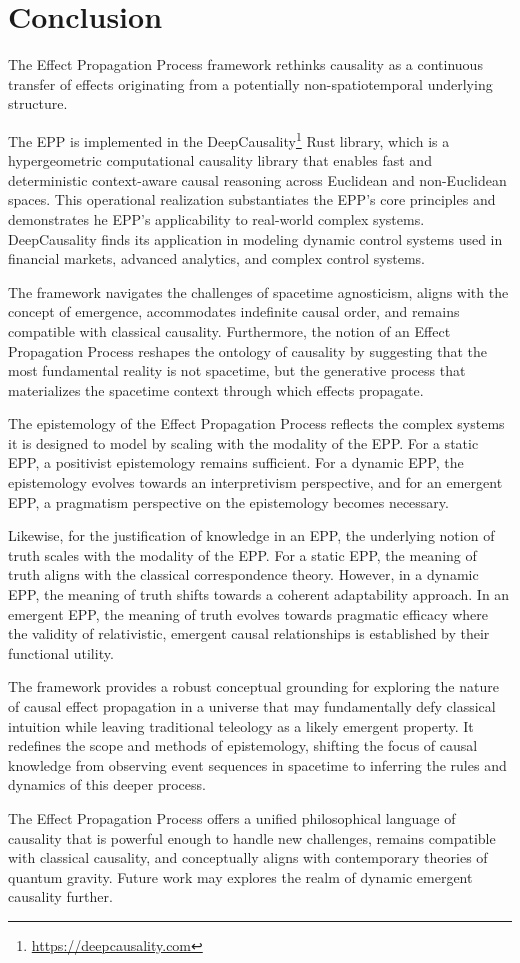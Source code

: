 \section{Conclusion}
\label{sec:conclusion}

The Effect Propagation Process framework rethinks causality as a continuous transfer of effects originating from a potentially non-spatiotemporal underlying structure. 

The EPP is implemented in the DeepCausality\footnote{\url{https://deepcausality.com}} Rust library, which is a hypergeometric computational causality library that enables fast and deterministic context-aware causal reasoning across Euclidean and non-Euclidean spaces. This operational realization substantiates the EPP’s core principles and demonstrates he EPP’s applicability to real-world complex systems.  DeepCausality finds its application in modeling dynamic control systems used in financial markets, advanced analytics, and complex control systems.

The framework navigates the challenges of spacetime agnosticism, aligns with the concept of emergence, accommodates indefinite causal order, and remains compatible with classical causality. Furthermore, the notion of an Effect Propagation Process reshapes the ontology of causality by suggesting that the most fundamental reality is not spacetime, but the generative process that materializes the spacetime context through which effects propagate.

The epistemology of the Effect Propagation Process reflects the complex systems it is designed to model by scaling with the modality of the EPP. For a static EPP, a positivist epistemology remains sufficient. For a dynamic EPP, the epistemology evolves towards an interpretivism perspective, and for an emergent EPP, a pragmatism perspective on the epistemology becomes necessary.

Likewise, for the justification of knowledge in an EPP, the underlying notion of truth scales with the modality of the EPP. For a static EPP, the meaning of truth aligns with the classical correspondence theory. However, in a dynamic EPP, the meaning of truth shifts towards a coherent adaptability approach. In an emergent EPP, the meaning of truth evolves towards pragmatic efficacy where the validity of relativistic, emergent causal relationships is established by their functional utility.

The framework provides a robust conceptual grounding for exploring the nature of causal effect propagation in a universe that may fundamentally defy classical intuition while leaving traditional teleology as a likely emergent property. It redefines the scope and methods of epistemology, shifting the focus of causal knowledge from observing event sequences in spacetime to inferring the rules and dynamics of this deeper process.

The Effect Propagation Process offers a unified philosophical language of causality that is powerful enough to handle new challenges, remains compatible with classical causality, and conceptually aligns with contemporary theories of quantum gravity. Future work may explores the realm of dynamic emergent causality further. 


\newpage
